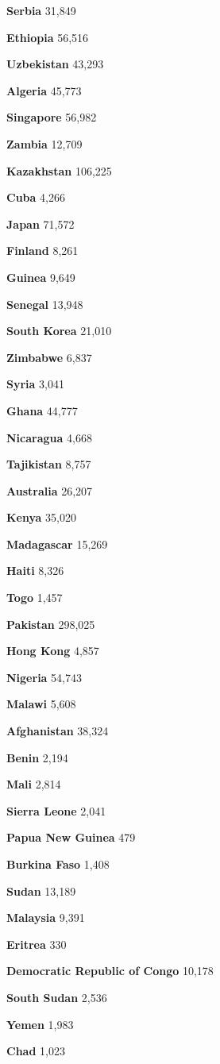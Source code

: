 \textbf{Serbia} 31,849

\textbf{Ethiopia} 56,516

\textbf{Uzbekistan} 43,293

\textbf{Algeria} 45,773

\textbf{Singapore} 56,982

\textbf{Zambia} 12,709

\textbf{Kazakhstan} 106,225

\textbf{Cuba} 4,266

\textbf{Japan} 71,572

\textbf{Finland} 8,261

\textbf{Guinea} 9,649

\textbf{Senegal} 13,948

\textbf{South Korea} 21,010

\textbf{Zimbabwe} 6,837

\textbf{Syria} 3,041

\textbf{Ghana} 44,777

\textbf{Nicaragua} 4,668

\textbf{Tajikistan} 8,757

\textbf{Australia} 26,207

\textbf{Kenya} 35,020

\textbf{Madagascar} 15,269

\textbf{Haiti} 8,326

\textbf{Togo} 1,457

\textbf{Pakistan} 298,025

\textbf{Hong Kong} 4,857

\textbf{Nigeria} 54,743

\textbf{Malawi} 5,608

\textbf{Afghanistan} 38,324

\textbf{Benin} 2,194

\textbf{Mali} 2,814

\textbf{Sierra Leone} 2,041

\textbf{Papua New Guinea} 479

\textbf{Burkina Faso} 1,408

\textbf{Sudan} 13,189

\textbf{Malaysia} 9,391

\textbf{Eritrea} 330

\textbf{Democratic Republic of Congo} 10,178

\textbf{South Sudan} 2,536

\textbf{Yemen} 1,983

\textbf{Chad} 1,023

